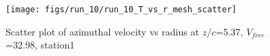 \begin{figure}[H]
\centering
\texttt{[image: figs/run\_10/run\_10\_T\_vs\_r\_mesh\_scatter]}
\caption{Scatter plot of azimuthal velocity vs radius at $z/c$=5.37, $V_{free}$=32.98, station1}
\label{fig:run_10_T_vs_r_mesh_scatter}
\end{figure}


